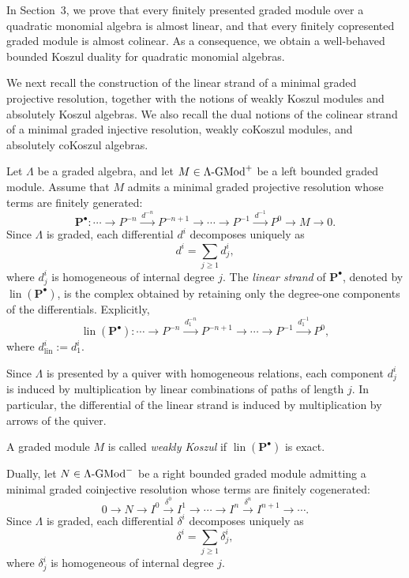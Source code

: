 \documentclass[11pt]{article}
\theoremstyle{definition}
\theoremstyle{remark}
\begin{document}
In Section~3, we prove that every finitely presented graded module over a
quadratic monomial algebra is almost linear, and that every finitely copresented
graded module is almost colinear. As a consequence, we obtain a well-behaved
bounded Koszul duality for quadratic monomial algebras. 

\medskip 

We next recall the construction of the linear strand of a minimal graded projective resolution, together with the notions of weakly Koszul modules and absolutely Koszul algebras. We also recall the dual notions of the colinear strand of a minimal graded injective resolution, weakly coKoszul modules, and absolutely coKoszul algebras.

Let \(\Lambda\) be a graded algebra, and let \(M \in \Lambda\textup{-}\mathrm{GMod}^{+}\) be a left bounded graded module. Assume that \(M\) admits a minimal graded projective resolution whose terms are finitely generated: \[ \mathbf{P}^{\bullet}\colon \cdots \longrightarrow P^{-n} \xrightarrow{\,d^{-n}\,} P^{-n+1} \longrightarrow \cdots \longrightarrow P^{-1} \xrightarrow{\,d^{-1}\,} P^{0} \longrightarrow M \longrightarrow 0. \] Since \(\Lambda\) is graded, each differential \(d^{i}\) decomposes uniquely as \[ d^{i}=\sum_{j\geq 1} d^{i}_{j}, \] where \(d^{i}_{j}\) is homogeneous of internal degree \(j\). The \emph{linear strand} of \(\mathbf{P}^{\bullet}\), denoted by \(\operatorname{lin}(\mathbf{P}^{\bullet})\), is the complex obtained by retaining only the degree-one components of the differentials. Explicitly, \[ \operatorname{lin}(\mathbf{P}^{\bullet})\colon \cdots \longrightarrow P^{-n} \xrightarrow{\,d^{-n}_{1}\,} P^{-n+1} \longrightarrow \cdots \longrightarrow P^{-1} \xrightarrow{\,d^{-1}_{1}\,} P^{0}, \] where \(d^{i}_{\operatorname{lin}}:=d^{i}_{1}\).

Since \(\Lambda\) is presented by a quiver with homogeneous relations, each component \(d^{i}_{j}\) is induced by multiplication by linear combinations of paths of length \(j\). In particular, the differential of the linear strand is induced by multiplication by arrows of the quiver.

A graded module \(M\) is called \emph{weakly Koszul} if
\(\operatorname{lin}(\mathbf{P}^{\bullet})\) is exact.

Dually, let \(N\in \Lambda\textup{-}\mathrm{GMod}^{-}\) be a right bounded graded module admitting a minimal graded coinjective resolution whose terms are finitely cogenerated: \[ 0\longrightarrow N \longrightarrow I^{0} \xrightarrow{\delta^{0}} I^{1} \longrightarrow \cdots \longrightarrow I^{n} \xrightarrow{\delta^{n}} I^{n+1} \longrightarrow\cdots . \] Since \(\Lambda\) is graded, each differential \(\delta^{i}\) decomposes uniquely as \[ \delta^{i} = \sum_{j\geq 1}\delta^{i}_{j}, \] where \(\delta^{i}_{j}\) is homogeneous of internal degree \(j\).
\end{document}
